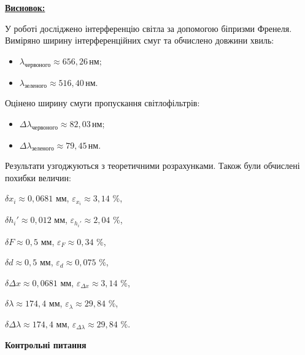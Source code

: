 \documentclass[12pt,a4paper]{article}
\begin{document}
    \newpage

    \setlength{\parindent}{0pt}

    \textbf{\underline{Висновок:}}
    \vspace{1em}

    \setlength{\parindent}{1.5em}

    У роботі досліджено інтерференцію світла за допомогою біпризми Френеля. Виміряно ширину інтерференційних смуг та обчислено довжини хвиль:

    \begin{itemize}
        \item $\lambda_{\text{червоного}} \approx 656{,}26\,\text{нм}$;
        \item $\lambda_{\text{зеленого}} \approx 516{,}40\,\text{нм}$.
    \end{itemize}

    Оцінено ширину смуги пропускання світлофільтрів:

    \begin{itemize}
        \item $\Delta \lambda_{\text{червоного}} \approx 82{,}03\,\text{нм}$;
        \item $\Delta \lambda_{\text{зеленого}} \approx 79{,}45\,\text{нм}$.
    \end{itemize}

    Результати узгоджуються з теоретичними розрахунками. Також були обчислені похибки величин:

    \vspace{1em}

    $\delta x_i \approx 0,0681$ мм, $\varepsilon_{x_i} \approx 3,14$ \%,
    
    $\delta h_i' \approx 0,012$ мм, $\varepsilon_{h_i'} \approx 2,04$ \%,

    $\delta F \approx 0,5$ мм, $\varepsilon_F \approx 0,34$ \%,

    $\delta d \approx 0,5$ мм, $\varepsilon_d \approx 0,075$ \%,

    $\delta \Delta x \approx 0,0681$ мм, $\varepsilon_{\Delta x} \approx 3,14$ \%,

    $\delta \lambda \approx 174,4$ мм, $\varepsilon_{\lambda} \approx 29,84$ \%,

    $\delta \Delta \lambda \approx 174,4$ мм, $\varepsilon_{\Delta \lambda} \approx 29,84$ \%.

    \newpage

    \begin{center} \textbf{\large Контрольні питання} \end{center}
\end{document}

